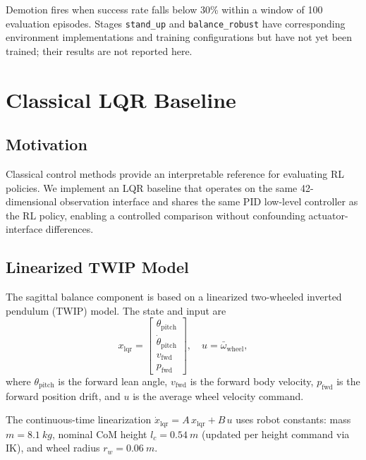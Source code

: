 \documentclass[conference]{IEEEtran}
\begin{document}
Demotion fires when success rate falls below 30\% within a window
of 100 evaluation episodes.
Stages \texttt{stand\_up} and \texttt{balance\_robust} have corresponding
environment implementations and training configurations
but have not yet been trained; their results are not reported here.

\section{Classical LQR Baseline}
\label{sec:lqr}

\subsection{Motivation}
Classical control methods provide an interpretable reference
for evaluating RL policies.
We implement an LQR baseline that operates on
the same 42-dimensional observation interface and shares the same
PID low-level controller as the RL policy, enabling a
controlled comparison without confounding actuator-interface differences.

\subsection{Linearized TWIP Model}
The sagittal balance component is based on a linearized
two-wheeled inverted pendulum (TWIP) model.
The state and input are
\begin{equation}
x_{\mathrm{lqr}} =
\begin{bmatrix}
\theta_{\mathrm{pitch}} \\
\dot{\theta}_{\mathrm{pitch}} \\
v_{\mathrm{fwd}} \\
p_{\mathrm{fwd}}
\end{bmatrix},
\quad
u = \bar{\omega}_{\mathrm{wheel}},
\end{equation}
where $\theta_{\mathrm{pitch}}$ is the forward lean angle,
$v_{\mathrm{fwd}}$ is the forward body velocity,
$p_{\mathrm{fwd}}$ is the forward position drift,
and $u$ is the average wheel velocity command.

The continuous-time linearization
$\dot{x}_{\mathrm{lqr}} = A\,x_{\mathrm{lqr}} + B\,u$
uses robot constants:
mass $m = \SI{8.1}{kg}$,
nominal CoM height $l_c = \SI{0.54}{m}$ (updated per height command via IK),
and wheel radius $r_w = \SI{0.06}{m}$.
\end{document}
